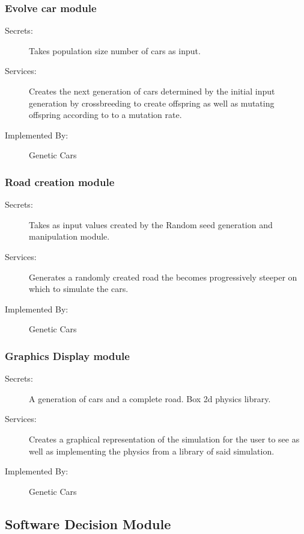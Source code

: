 \documentclass[12pt, titlepage]{article}
\begin{document}
\subsubsection{Evolve car module}

\begin{description}
\item[Secrets:] Takes population size number of cars as input.
\item[Services:] Creates the next generation of cars determined by the initial input generation by crossbreeding to create offspring as well as mutating offspring according to to a mutation rate.
\item[Implemented By:] Genetic Cars
\end{description}

\subsubsection{Road creation module}

\begin{description}
\item[Secrets:] Takes as input values created by the Random seed generation and manipulation module.
\item[Services:] Generates a randomly created road the becomes progressively steeper on which to simulate the cars.
\item[Implemented By:] Genetic Cars
\end{description}

\subsubsection{Graphics Display module}

\begin{description}
\item[Secrets:] A generation of cars and a complete road. Box 2d physics library.
\item[Services:] Creates a graphical representation of the simulation for the user to see as well as implementing the physics from a library of said simulation.
\item[Implemented By:] Genetic Cars
\end{description}

\subsection{Software Decision Module}
\end{document}
